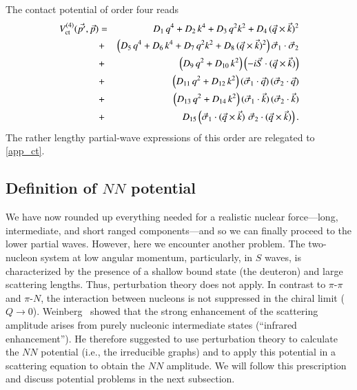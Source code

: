 \documentclass[sort&compress,preprint,3p]{elsarticle}
\def\be{\begin{eqnarray}}
\def\ee{\end{eqnarray}}
\begin{document}
The contact potential of order four reads
\be
V_{\rm ct}^{(4)}(\vec{p'},\vec{p}) &=&
D_1 \, q^4 +
D_2 \, k^4 +
D_3 \, q^2 k^2 +
D_4 \, (\vec{q} \times \vec{k})^2 
\nonumber 
\\ &+& 
\left(
D_5 \, q^4 +
D_6 \, k^4 +
D_7 \, q^2 k^2 +
D_8 \, (\vec{q} \times \vec{k})^2 
\right) \vec{\sigma}_1 \cdot \vec{\sigma}_2 
\nonumber 
\\ &+& 
\left(
D_9 \, q^2 +
D_{10} \, k^2 
\right) \left( -i \vec{S} \cdot (\vec{q} \times \vec{k}) \right)
\nonumber 
\\ &+& 
\left(
D_{11} \, q^2 +
D_{12} \, k^2 
\right) ( \vec{\sigma}_1 \cdot \vec{q} )\,( \vec{\sigma}_2 
\cdot \vec{q})
\nonumber 
\\ &+& 
\left(
D_{13} \, q^2 +
D_{14} \, k^2 
\right) ( \vec{\sigma}_1 \cdot \vec{k} )\,( \vec{\sigma}_2 
\cdot \vec{k})
\nonumber 
\\ &+& 
D_{15} \left( 
\vec{\sigma}_1 \cdot (\vec{q} \times \vec{k}) \, \,
\vec{\sigma}_2 \cdot (\vec{q} \times \vec{k}) 
\right) .
\label{eq_ct4}
\ee
The rather lengthy partial-wave expressions of this order
are relegated to \ref{app_ct}.



\subsection{Definition of $NN$ potential
\label{sec_pot}}

We have now rounded up everything needed for a realistic
nuclear force---long, intermediate, and short ranged 
components---and so we can finally proceed to the lower
partial waves. However, here we encounter another problem.
The two-nucleon system at low angular momentum, particularly,
in $S$ waves, is characterized by the
presence of a shallow bound state (the deuteron)
and large scattering lengths.
Thus, perturbation theory does not apply.
In contrast to $\pi$-$\pi$ and $\pi$-$N$,
the interaction between nucleons is not suppressed
in the chiral limit ($Q\rightarrow 0$).
Weinberg~\cite{Wei90,Wei91} showed that the strong enhancement of the
scattering amplitude arises from purely nucleonic intermediate
states (``infrared enhancement''). He therefore suggested to use perturbation theory to
calculate the $NN$ potential (i.e., the irreducible graphs) and to apply this potential
in a scattering equation 
to obtain the $NN$ amplitude. We will follow
this prescription and discuss potential problems in the next subsection.
\end{document}

